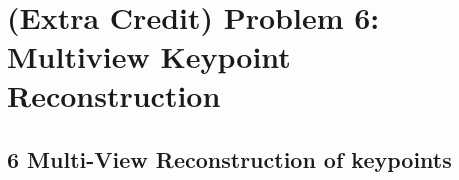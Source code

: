 \documentclass[11pt]{article}
\begin{document}
    \begin{center}
    \end{center}
    { \hspace*{\fill} \\}
    
    \begin{center}
    \end{center}
    { \hspace*{\fill} \\}
    
    \begin{center}
    \end{center}
    { \hspace*{\fill} \\}
    
    \hypertarget{extra-credit-problem-6-multiview-keypoint-reconstruction}{%
\section{(Extra Credit) Problem 6: Multiview Keypoint
Reconstruction}\label{extra-credit-problem-6-multiview-keypoint-reconstruction}}

    \hypertarget{multi-view-reconstruction-of-keypoints}{%
\subsection{6 Multi-View Reconstruction of
keypoints}\label{multi-view-reconstruction-of-keypoints}}
\end{document}
